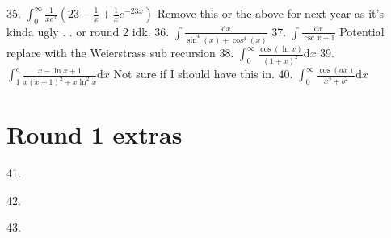 \documentclass{article}
\newcommand{\dd}{\mathrm{d}}
\begin{document}
\begin{flushleft}
35. $\int_0^{\infty} \frac{1}{xe^x}\left(23-\frac{1}{x}+\frac{1}{x}e^{-23x}\right)$ Remove this or the above for next year as it's kinda ugly . . or round 2 idk. \newline  \newline \newline 
36. $\int \frac{\dd x}{\sin^4(x)+\cos^4(x)}$ \newline  \newline \newline 
37. $\int \frac{\dd x}{\csc{x}+1}$ Potential replace with the Weierstrass sub recursion\newline  \newline \newline 
38. $\int_0^{\infty} \frac{\cos(\ln{x})}{(1+x)^2} \dd x$ \newline  \newline \newline 
39. $\int_1^e \frac{x-\ln{x}+1}{x(x+1)^2+x\ln^2{x}} \dd x$  Not sure if I should have this in. \newline  \newline \newline 
40. $\int_0^{\infty} \frac{\cos(ax)}{x^2+b^2} \dd x$  \newline  \newline \newline 

\section{Round 1 extras}

41. 

42. 

43. 
\end{flushleft}
\end{document}
